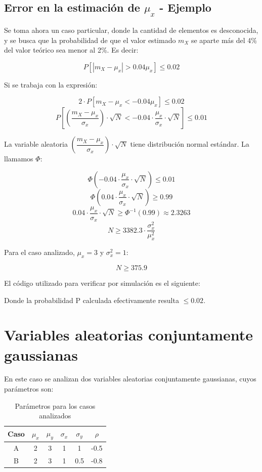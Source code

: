 \subsection{Error en la estimaci\'on de $\mu_x$ - Ejemplo}

Se toma ahora un caso particular, donde la cantidad de elementos es desconocida, y se busca que la probabilidad de que el valor estimado $m_X$ se aparte m\'as del 4\% del valor te\'orico sea menor al 2\%. Es decir:

\[
P[|m_X - \mu_x| > 0.04\mu_x] \leq 0.02
\]

Si se trabaja con la expresi\'on:

\[
2 \cdot P[m_X - \mu_x < -0.04\mu_x] \leq 0.02
\]
\[
P[\left( \frac{m_X - \mu_x}{\sigma_x} \right) \cdot \sqrt{N} < -0.04 \cdot \frac{\mu_x}{\sigma_x} \cdot \sqrt{N}] \leq 0.01
\]

La variable aleatoria $\left( \dfrac{m_X - \mu_x}{\sigma_x} \right) \cdot \sqrt{N}$ tiene distribuci\'on normal est\'andar. La llamamos $\Phi$:

\[
\Phi \left( -0.04 \cdot \frac{\mu_x}{\sigma_x} \cdot \sqrt{N} \right) \leq 0.01
\]
\[
\Phi \left( 0.04 \cdot \frac{\mu_x}{\sigma_x} \cdot \sqrt{N} \right) \geq 0.99
\]
\[
0.04 \cdot \frac{\mu_x}{\sigma_x} \cdot \sqrt{N} \geq \Phi^{-1}(0.99) \approx 2.3263
\]
\[
N \geq 3382.3 \cdot \frac{\sigma^2_x}{\mu^2_x}
\]

Para el caso analizado, $\mu_x = 3$ y $\sigma^2_x = 1$:

\[
N \geq 375.9
\]

El c\'odigo utilizado para verificar por simulaci\'on es el siguiente:



Donde la probabilidad P calculada efectivamente resulta $\leq 0.02$.

\newpage

\section{Variables aleatorias conjuntamente gaussianas}

En este caso se analizan dos variables aleatorias conjuntamente gaussianas, cuyos par\'ametros son:

\begin{table}[ht]
\begin{centering}
\begin{tabular}{|c||c|c|c|c|c|}
\hline 
Caso & $\mu_x$ & $\mu_y$ & $\sigma_x$ & $\sigma_y$ & $\rho$\\
\hline 
\hline 
A & 2 & 3 & 1 & 1 & -0.5\tabularnewline
\hline 
B & 2 & 3 & 1 & 0.5 & -0.8\tabularnewline
\hline 
\end{tabular}
\par\end{centering}
\caption{Par\'ametros para los casos analizados}

\end{table}

